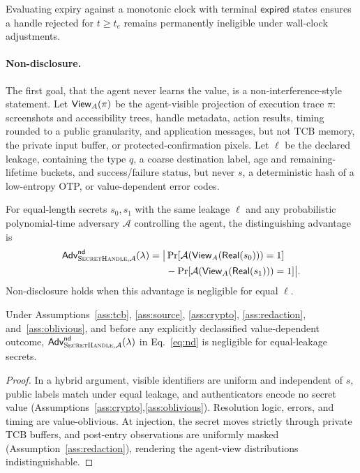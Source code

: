 \begin{proposition}
\label{prop:expiry}
Evaluating expiry against a monotonic clock with terminal $\mathsf{expired}$ states ensures a handle rejected for $t\ge t_e$ remains permanently ineligible under wall-clock adjustments.
\end{proposition}

\paragraph{Non-disclosure.} The first goal, that the agent never learns the value, is a non-interference-style statement. Let $\mathsf{View}_A(\pi)$ be the agent-visible projection of execution trace $\pi$: screenshots and accessibility trees, handle metadata, action results, timing rounded to a public granularity, and application messages, but not TCB memory, the private input buffer, or protected-confirmation pixels. Let $\ell$ be the declared leakage, containing the type $q$, a coarse destination label, age and remaining-lifetime buckets, and success/failure status, but never $s$, a deterministic hash of a low-entropy OTP, or value-dependent error codes.

\begin{definition}
\label{def:nd}
For equal-length secrets $s_0,s_1$ with the same leakage $\ell$ and any probabilistic polynomial-time adversary $\mathcal{A}$ controlling the agent, the distinguishing advantage is
\begin{equation}
\begin{aligned}
\mathsf{Adv}^{\mathsf{nd}}_{\textsc{SecretHandle},\mathcal{A}}(\lambda)=\bigl|&\Pr[\mathcal{A}(\mathsf{View}_A(\mathsf{Real}(s_0)))=1]\\
&-\Pr[\mathcal{A}(\mathsf{View}_A(\mathsf{Real}(s_1)))=1]\bigr|.
\end{aligned}
\label{eq:nd}
\end{equation}
Non-disclosure holds when this advantage is negligible for equal $\ell$.
\end{definition}

\begin{theorem}
\label{thm:nd}
Under Assumptions~\ref{ass:tcb}, \ref{ass:source}, \ref{ass:crypto}, \ref{ass:redaction}, and~\ref{ass:oblivious}, and before any explicitly declassified value-dependent outcome, $\mathsf{Adv}^{\mathsf{nd}}_{\textsc{SecretHandle},\mathcal{A}}(\lambda)$ in Eq.~\eqref{eq:nd} is negligible for equal-leakage secrets.
\end{theorem}
\begin{proof}
In a hybrid argument, visible identifiers are uniform and independent of $s$, public labels match under equal leakage, and authenticators encode no secret value (Assumptions~\ref{ass:crypto},\ref{ass:oblivious}). Resolution logic, errors, and timing are value-oblivious. At injection, the secret moves strictly through private TCB buffers, and post-entry observations are uniformly masked (Assumption~\ref{ass:redaction}), rendering the agent-view distributions indistinguishable.
\end{proof}

